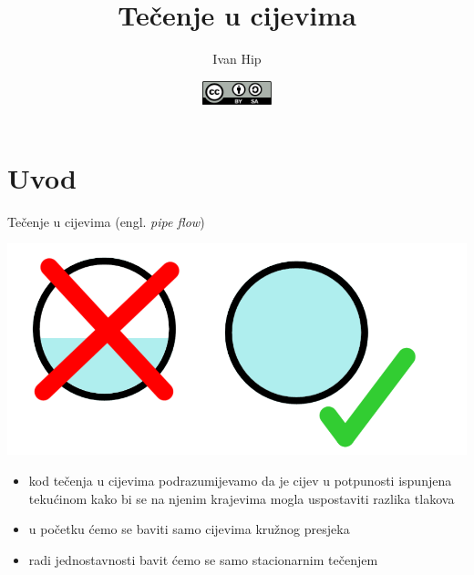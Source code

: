 \documentclass[croatian]{beamer}
\begin{document}
\title{Tečenje u cijevima}
\author{Ivan Hip}
\date{\includegraphics[width=0.15\textwidth]{../CC-by-sa.pdf}}

\begin{frame}
  \titlepage
\end{frame}

\section{Uvod}
\begin{frame}{Tečenje u cijevima (engl. \emph{pipe flow})}

\begin{center}
\includegraphics[width=0.5\paperwidth]{slike/slika1.PNG}
\par\end{center}
\begin{itemize}
\item kod tečenja u cijevima podrazumijevamo da je cijev u potpunosti ispunjena
tekućinom kako bi se na njenim krajevima mogla uspostaviti razlika
tlakova
\item u početku ćemo se baviti samo cijevima kružnog presjeka
\item radi jednostavnosti bavit ćemo se samo \alert{stacionarnim tečenjem}
\end{itemize}
\end{frame}
\end{document}
